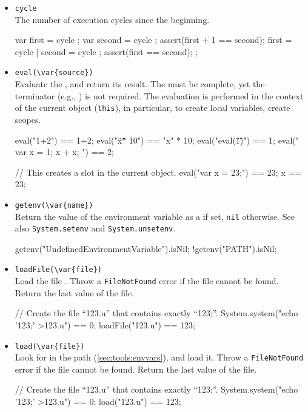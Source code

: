\begin{itemize}
\item \lstinline|cycle|\experimental\\
  The number of execution cycles since the beginning.
\begin{urbiscript}[firstnumber=last]
{
  var first = cycle ; var second = cycle ;
  assert(first + 1 == second);
  first = cycle | second = cycle ;
  assert(first == second);
};
\end{urbiscript}

\item \lstinline|eval(\var{source})|\\
  Evaluate the \us {}, and return its result.  The
   must be complete, yet the terminator (e.g., \samp{;})
  is not required.  The evaluation is performed in the context of the
  current object (\lstinline|this|), in particular, to create local
  variables, create scopes.
\begin{urbiassert}[firstnumber=last]
eval("1+2") == 1+2;
eval("\"x\" * 10") == "x" * 10;
eval("eval(\"1\")") ==  1;
eval("{ var x = 1; x + x; }") ==  2;

// This creates a slot in the current object.
eval("var x = 23;") == 23;
x == 23;
\end{urbiassert}

\item \lstinline|getenv(\var{name})|\\
  Return the value of the environment variable  as a
   if set, \lstinline|nil| otherwise.  See also
  \lstinline|System.setenv| and \lstinline|System.unsetenv|.
\begin{urbiassert}[firstnumber=last]
getenv("UndefinedEnvironmentVariable").isNil;
!getenv("PATH").isNil;
\end{urbiassert}

\item \lstinline|loadFile(\var{file})|\\
  Load the \us file .  Throw a \lstinline|FileNotFound|
  error if the file cannot be found.  Return the last value of the
  file.
\begin{urbiassert}[firstnumber=last]
// Create the file ``123.u'' that contains exactly ``123;''.
System.system("echo '123;' >123.u") == 0;
loadFile("123.u") == 123;
\end{urbiassert}

\item \lstinline|load(\var{file})|\\
  Look for  in the \urbi path (\autoref{sec:tools:envvars}),
  and load it.  Throw a \lstinline|FileNotFound| error if the file
  cannot be found.  Return the last value of the file.
\begin{urbiassert}[firstnumber=last]
// Create the file ``123.u'' that contains exactly ``123;''.
System.system("echo '123;' >123.u") == 0;
load("123.u") == 123;
\end{urbiassert}


\end{itemize}
